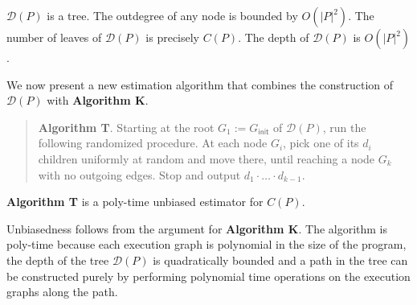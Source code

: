 \documentclass[acmsmall]{acmart}
\newcommand{\init}{\mathsf{init}}
\newcommand{\porf}[1]{\textcolor{darkgray}{\mathsf{po}\textcolor{green!60!black}{\mathsf{rf}}}_{#1}}
\begin{document}


\begin{proposition}\label{prop:trust-size}
$\mathcal{D}(P)$ is a tree.
The outdegree of any node is bounded by $O(|P|^2)$.
The number of leaves of $\mathcal{D}(P)$ is precisely $C(P)$.
The depth of $\mathcal{D}(P)$ is $O(|P|^2)$.
\end{proposition}

We now present a new estimation algorithm that combines the construction of $\mathcal{D}(P)$ with \textbf{Algorithm K}.

\begin{verse}
\textbf{Algorithm T}. 
Starting at the root $G_1 := G_\init$ of $\mathcal{D}(P)$, run the following
randomized procedure.
At each node $G_i$, pick one of its $d_i$ children
uniformly at random and move there, until reaching a node $G_k$ with
no outgoing edges.
Stop and output $d_1\cdot\ldots\cdot d_{k-1}$.
\end{verse}

\begin{proposition}
\textbf{Algorithm T} is a poly-time unbiased estimator for $C(P)$.
\end{proposition}

Unbiasedness follows from the argument for \textbf{Algorithm K}.
The algorithm is poly-time because each execution graph is polynomial in the size of the program,
the depth of the tree $\mathcal{D}(P)$ is quadratically 
bounded and a path in the tree can be constructed purely by performing polynomial time operations
on the execution graphs along the path.
\end{document}
